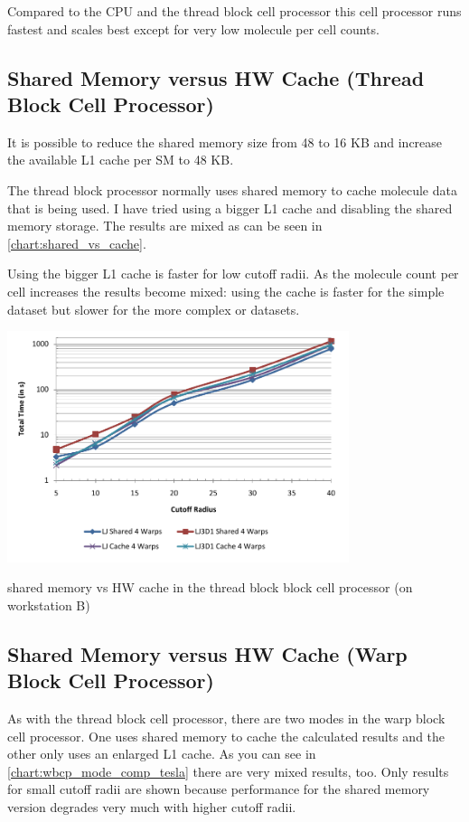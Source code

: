 Compared to the CPU and the thread block cell processor this cell processor runs fastest and scales best except for very low molecule per cell counts.

\subsection{Shared Memory versus HW Cache (Thread Block Cell Processor)}
It is possible to reduce the shared memory size from 48 to 16 KB and increase the available L1 cache per SM to 48 KB.

The thread block processor normally uses shared memory to cache molecule data that is being used.
I have tried using a bigger L1 cache and disabling the shared memory storage. The results are mixed as can be seen in \autoref{chart:shared_vs_cache}.

Using the bigger L1 cache is faster for low cutoff radii. As the molecule count per cell increases the results become mixed: using the cache is faster for the simple  dataset but slower for the more complex  or  datasets.
\begin{chart}
\centering
\includegraphics[width=0.75\textwidth]{plots/shared_vs_cached_tb_tesla.pdf}
\caption{shared memory vs HW cache in the thread block block cell processor (on workstation B)}
\label{chart:shared_vs_cache}
\end{chart}

\subsection{Shared Memory versus HW Cache (Warp Block Cell Processor)}
As with the thread block cell processor, there are two modes in the warp block cell processor. One uses shared memory to cache the calculated results and the other only uses an enlarged L1 cache.
As you can see in \autoref{chart:wbcp_mode_comp_tesla} there are very mixed results, too. Only results for small cutoff radii are shown because performance for the shared memory version degrades very much with higher cutoff radii.

